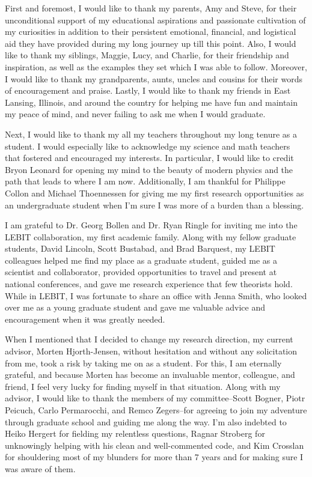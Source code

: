 \documentclass[../thesis.tex]{subfiles}
\begin{document}
First and foremost, I would like to thank my parents, Amy and Steve, for their unconditional support of my educational aspirations and passionate cultivation of my curiosities in addition to their persistent emotional, financial, and logistical aid they have provided during my long journey up till this point.  Also, I would like to thank my siblings, Maggie, Lucy, and Charlie, for their friendship and inspiration, as well as the examples they set which I was able to follow.  Moreover, I would like to thank my grandparents, aunts, uncles and cousins for their words of encouragement and praise.  Lastly, I would like to thank my friends in East Lansing, Illinois, and around the country for helping me have fun and maintain my peace of mind, and never failing to ask me when I would graduate.

Next, I would like to thank my all my teachers throughout my long tenure as a student.  I would especially like to acknowledge my science and math teachers that fostered and encouraged my interests.  In particular, I would like to credit Bryon Leonard for opening my mind to the beauty of modern physics and the path that leads to where I am now.  Additionally, I am thankful for Philippe Collon and Michael Thoennessen for giving me my first research opportunities as an undergraduate student when I'm sure I was more of a burden than a blessing.

I am grateful to Dr. Georg Bollen and Dr. Ryan Ringle for inviting me into the LEBIT collaboration, my first academic family.  Along with my fellow graduate students, David Lincoln, Scott Bustabad, and Brad Barquest, my LEBIT colleagues helped me find my place as a graduate student, guided me as a scientist and collaborator, provided opportunities to travel and present at national conferences, and gave me research experience that few theorists hold.  While in LEBIT, I was fortunate to share an office with Jenna Smith, who looked over me as a young graduate student and gave me valuable advice and encouragement when it was greatly needed.

When I mentioned that I decided to change my research direction, my current advisor, Morten Hjorth-Jensen, without hesitation and without any solicitation from me, took a risk by taking me on as a student.  For this, I am eternally grateful, and because Morten has become an invaluable mentor, colleague, and friend, I feel very lucky for finding myself in that situation.  Along with my advisor, I would like to thank the members of my committee--Scott Bogner, Piotr Peicuch, Carlo Permarocchi, and Remco Zegers--for agreeing to join my adventure through graduate school and guiding me along the way.  I'm also indebted to Heiko Hergert for fielding my relentless questions, Ragnar Stroberg for unknowingly helping with his clean and well-commented code, and Kim Crosslan for shouldering most of my blunders for more than 7 years and for making sure I was aware of them.
\end{document}
